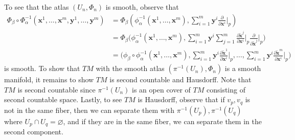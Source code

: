 \documentclass{report}
\begin{document}
\begin{mdframed}
To see that the atlas $(U_n,\Phi_n)$ is smooth, observe that 
\begin{align*}
\Phi_\beta \circ \Phi^{-1}_\alpha (\textbf{x}^1,\dots ,\textbf{x}^m ,\textbf{y}^1,\dots ,\textbf{y}^m)&= \Phi_\beta (\phi_\alpha ^{-1}(\textbf{x}^1,\dots ,\textbf{x}^m),\sum_{i=1}^m \textbf{y}^i \frac{\partial }{\partial \textbf{x}^i}\Big|_p)\\
&=\Phi_\beta \Big(\phi_\alpha ^{-1}(\textbf{x}^1,\dots ,\textbf{x}^m),\sum_{i=1}^m \textbf{y}^i \sum_{j=1}^m \frac{\partial \tilde{\textbf{x}}^j}{\partial  \textbf{x}^i}\Big|_p \frac{\partial }{\partial \tilde{\textbf{x}}^j}\Big|_p\Big)\\
&=\Big(\phi_\beta  \circ \phi^{-1}_\alpha (\textbf{x}^1,\dots ,\textbf{x}^m),\sum_{i=1}^m \textbf{y}^i \frac{\partial \tilde{\textbf{x}} ^1 }{\partial \textbf{x}^i}\Big|_p, \dots , \sum_{i=1}^m \textbf{y}^i \frac{\partial \tilde{\textbf{x}}^m }{\partial \textbf{x}^i}\Big|_p  \Big)
\end{align*}
is smooth. To show that $TM$ with the smooth atlas  $(\pi^{-1}(U_n),\Phi_n)$ is a smooth manifold, it remains to show $TM$ is second countable and Hausdorff. Note that $TM$ is second countable since  $\pi^{-1}(U_n)$ is an open cover of $TM$ consisting of second countable space. Lastly, to see $TM$ is Hausdorff, observe that if $v_p,v_q$ is not in the same fiber, then we can separate them with $\pi^{-1}(U_p),\pi^{-1}(U_q)$ where $U_p\cap U_q=\varnothing$, and if they are in the same fiber, we can separate them in the second component. \\




\end{mdframed}
\end{document}
